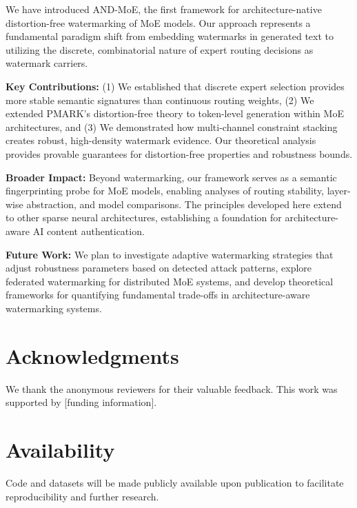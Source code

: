 \documentclass[letterpaper,twocolumn,10pt]{article}
\begin{document}
We have introduced AND-MoE, the first framework for architecture-native distortion-free watermarking of MoE models. Our approach represents a fundamental paradigm shift from embedding watermarks in generated text to utilizing the discrete, combinatorial nature of expert routing decisions as watermark carriers.

\textbf{Key Contributions:} (1) We established that discrete expert selection provides more stable semantic signatures than continuous routing weights, (2) We extended PMARK's distortion-free theory to token-level generation within MoE architectures, and (3) We demonstrated how multi-channel constraint stacking creates robust, high-density watermark evidence. Our theoretical analysis provides provable guarantees for distortion-free properties and robustness bounds.

\textbf{Broader Impact:} Beyond watermarking, our framework serves as a semantic fingerprinting probe for MoE models, enabling analyses of routing stability, layer-wise abstraction, and model comparisons. The principles developed here extend to other sparse neural architectures, establishing a foundation for architecture-aware AI content authentication.

\textbf{Future Work:} We plan to investigate adaptive watermarking strategies that adjust robustness parameters based on detected attack patterns, explore federated watermarking for distributed MoE systems, and develop theoretical frameworks for quantifying fundamental trade-offs in architecture-aware watermarking systems.

\section*{Acknowledgments}

We thank the anonymous reviewers for their valuable feedback. This work was supported by [funding information].

\section*{Availability}

Code and datasets will be made publicly available upon publication to facilitate reproducibility and further research.




\end{document}
